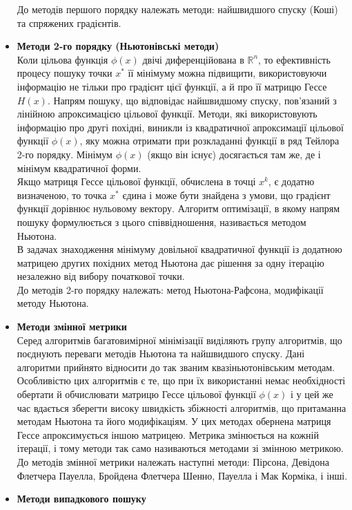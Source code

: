 \begin{itemize}
	До методів першого порядку належать методи: найшвидшого спуску (Коші) та спряжених градієнтів.
	\item \textbf{Методи 2-го порядку (Ньютонівські методи)}\\
	Коли цільова функція $\phi(x)$ двічі диференційована в $\mathbb{R}^n$, то ефективність процесу пошуку точки $x^*$ її мінімуму можна підвищити, використовуючи інформацію не тільки  про градієнт цієї функції, а й про її матрицю Гессе $H(x)$. Напрям пошуку, що відповідає найшвидшому спуску, пов'язаний з лінійною апроксимацією цільової функції. Методи, які використовують інформацію про другі похідні, виникли із квадратичної апроксимації цільової функції $\phi(x)$, яку можна отримати при розкладанні функції в ряд Тейлора 2-го порядку. Мінімум $\phi(x)$ (якщо він існує)  досягається там же, де і мінімум квадратичної форми. \\ 
	Якщо матриця Гессе цільової функції, обчислена в точці $x^k$, є додатно визначеною, то точка $x^*$ єдина і може бути знайдена з умови, що градієнт функції дорівнює нульовому вектору. Алгоритм оптимізації, в якому напрям пошуку формулюється з цього співвідношення, називається методом Ньютона. \\
	В задачах знаходження мінімуму довільної квадратичної функції із додатною матрицею других похідних метод Ньютона дає рішення за одну ітерацію незалежно від вибору початкової точки. \\
	До методів 2-го порядку належать: метод Ньютона-Рафсона, модифікації методу Ньютона.
	\item \textbf{Методи змінної метрики}\\
	Серед алгоритмів багатовимірної мінімізації виділяють групу алгоритмів, що поєднують переваги методів Ньютона та найшвидшого спуску. Дані алгоритми прийнято відносити до так званим квазіньютонівським методам. Особливістю цих алгоритмів є те, що при їх використанні немає необхідності обертати й обчислювати матрицю Гессе цільової функції $\phi(x)$ і у цей же час вдається зберегти високу швидкість збіжності алгоритмів, що притаманна методам Ньютона та його модифікаціям. У цих методах обернена матриця Гессе апроксимується іншою матрицею. Метрика змінюється на кожній ітерації, і тому методи так само називаються методами зі змінною метрикою. \\
	До методів змінної метрики належать наступні методи: Пірсона, Девідона Флетчера Пауелла, Бройдена Флетчера Шенно, Пауелла і Мак Корміка, і інші.
	\item \textbf{Методи випадкового пошуку} \\

\end{itemize}
